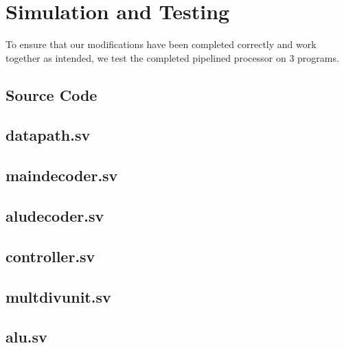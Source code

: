 \documentclass[titlepage,12pt,oneside,a4paper]{article}
\begin{document}
\section{Simulation and Testing}
To ensure that our modifications have been completed correctly and work together as intended, we test the completed pipelined processor on 3 programs.
\newpage
\appendix
\begin{multicols}{2}

\section{Source Code}
\label{appendix:src}
\subsection{datapath.sv}


\subsection{maindecoder.sv}


\subsection{aludecoder.sv}


\subsection{controller.sv}


\subsection{multdivunit.sv}
\label{appendix:multdivunit}


\subsection{alu.sv}



\end{multicols}
\end{document}
